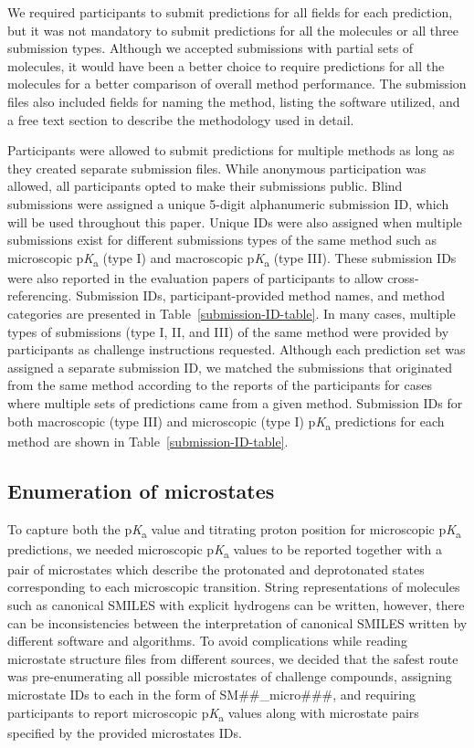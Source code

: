 \documentclass[9pt,lineno,final]{elife}
\newcommand{\pKa}{p\textit{K}\textsubscript{a}}
\begin{document}
We required participants to submit predictions for all fields for each prediction, but it was not mandatory to submit predictions for all the molecules or all three submission types. 
Although we accepted submissions with partial sets of molecules, it would have been a better choice to require predictions for all the molecules for a better comparison of overall method performance. 
The submission files also included fields for naming the method, listing the software utilized, and a free text section to describe the methodology used in detail. 

Participants were allowed to submit predictions for multiple methods as long as they created separate submission files. 
While anonymous participation was allowed, all participants opted to make their submissions public.
Blind submissions were assigned a unique 5-digit alphanumeric submission ID, which will be used throughout this paper. 
Unique IDs were also assigned when multiple submissions exist for different submissions types of the same method such as microscopic \pKa{} (type I) and macroscopic \pKa{} (type III). 
These submission IDs were also reported in the evaluation papers of participants to allow cross-referencing. 
Submission IDs, participant-provided method names, and method categories are presented in Table~\ref{submission-ID-table}. 
In many cases, multiple types of submissions (type I, II, and III) of the same method were provided by participants as challenge instructions requested. 
Although each prediction set was assigned a separate submission ID, we matched the submissions that originated from the same method according to the reports of the participants for cases where multiple sets of predictions came from a given method.
Submission IDs for both macroscopic (type III) and microscopic (type I) \pKa{} predictions for each method are shown in Table~\ref{submission-ID-table}. 

\subsection{Enumeration of microstates} \label{section-enumeration-of-microstates}

To capture both the \pKa{} value and titrating proton position for microscopic \pKa{} predictions, we needed microscopic \pKa{} values to be reported together with a pair of microstates which describe the protonated and deprotonated states corresponding to each microscopic transition.
String representations of molecules such as canonical SMILES with explicit hydrogens can be written, however, there can be inconsistencies between the interpretation of canonical SMILES written by different software and algorithms. 
To avoid complications while reading microstate structure files from different sources, we decided that the safest route was pre-enumerating all possible microstates of challenge compounds, assigning microstate IDs to each in the form of SM\#\#\_micro\#\#\#, and requiring participants to report microscopic \pKa{} values along with microstate pairs specified by the provided microstates IDs.   
\end{document}
